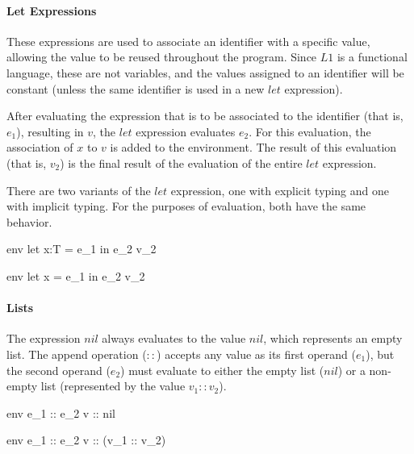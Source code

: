 \documentclass{article}
\begin{document}
\paragraph{Let Expressions}
These expressions are used to associate an identifier with a specific value, allowing the value to be reused throughout the program.
Since $L1$ is a functional language, these are not variables, and the values assigned to an identifier will be constant (unless the same identifier is used in a new $let$ expression).

After evaluating the expression that is to be associated to the identifier (that is, $e_1$), resulting in $v$, the $let$ expression evaluates $e_2$.
For this evaluation, the association of $x$ to $v$ is added to the environment.
The result of this evaluation (that is, $v_2$) is the final result of the evaluation of the entire $let$ expression.

There are two variants of the $let$ expression, one with explicit typing and one with implicit typing.
For the purposes of evaluation, both have the same behavior.

    {\mbox{env} \vdash let \; x:T = e_1 \; in \; e_2 \Downarrow v_2}
    
    {\mbox{env} \vdash let \; x = e_1 \; in \; e_2 \Downarrow v_2}
    
\bigskip

\paragraph{Lists}
The expression $nil$ always evaluates to the value $nil$, which represents an empty list.
The append operation ($::$) accepts any value as its first operand ($e_1$), but the second operand ($e_2$) must evaluate to either the empty list ($nil$) or a non-empty list (represented by the value $v_1 :: v_2$).


    {\mbox{env} \vdash e_1 :: e_2 \Downarrow v :: nil}
    
    {\mbox{env} \vdash e_1 :: e_2 \Downarrow v :: (v_1 :: v_2)}
    
\end{document}
